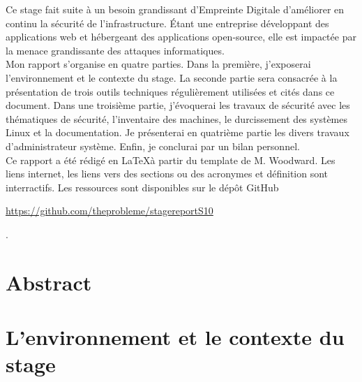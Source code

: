 \documentclass[12pt]{article}
\begin{document}
Ce stage fait suite à un besoin grandissant d'Empreinte Digitale d'améliorer en continu la sécurité de l'infrastructure. 
Étant une entreprise développant des applications web et hébergeant des applications open-source, elle est impactée par la menace grandissante des attaques informatiques. \\

Mon rapport s'organise en quatre parties. 
Dans la première, j'exposerai l'environnement et le contexte du stage. 
La seconde partie sera consacrée à la présentation de trois outils techniques régulièrement utilisées et cités dans ce document. 
Dans une troisième partie, j'évoquerai les travaux de sécurité avec les thématiques de sécurité, l'inventaire des machines, le durcissement des systèmes \gls{Linux} et la documentation. 
Je présenterai en quatrième partie les divers travaux d'administrateur système. 
Enfin, je conclurai par un bilan personnel. \\

Ce rapport a été rédigé en \LaTeX à partir du template de M. Woodward. 
Les liens internet, les liens vers des sections ou des acronymes et définition sont interractifs.
Les ressources sont disponibles sur le dépôt GitHub \begin{hilite} \url{https://github.com/theprobleme/stagereportS10} \end{hilite}.

\newpage
\section*{Abstract}

\newpage
\section{L'environnement et le contexte du stage}
\end{document}
